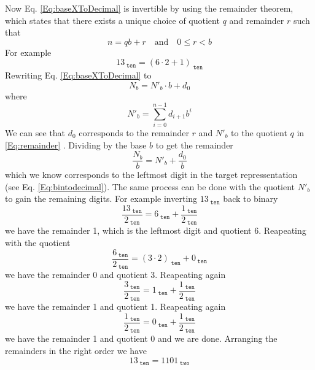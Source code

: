     Now Eq. \ref{Eq:baseXToDecimal} is invertible by using the remainder theorem, which states that there exists a unique choice of quotient $q$ and remainder $r$ such that 
    \begin{equation}\label{Eq:remainder}
        n = qb+r \quad \text{and} \quad 0 \leq r < b
    \end{equation}
    For example
    \begin{equation}
        13_{\;\texttt{ten}} = (6\cdot 2 + 1)_{\;\texttt{ten}}
    \end{equation}
    Rewriting Eq. \ref{Eq:baseXToDecimal} to
    \begin{equation}\label{Eq:baseXToDecimalRemainderForm}
        N_b = N'_b \cdot b+d_0
    \end{equation}
    where
    \begin{equation}
        N'_b = \sum_{i=0}^{n-1} d_{i+1} b^i
    \end{equation}
    We can see that $d_0$ corresponds to the remainder $r$ and $N'_b$ to the quotient $q$ in \ref{Eq:remainder} .
    Dividing by the base $b$ to get the remainder
    \begin{equation}
        \frac{N_b}{b} = N'_b +\frac{d_0}{b}
    \end{equation}
    which we know corresponds to the leftmost digit in the target repressentation (see Eq. \ref{Eq:bintodecimal}). The same process can be done with the quotient $N'_b$ to gain the remaining digits.
    For example inverting $13_{\;\texttt{ten}}$ back to binary
    \begin{equation}
        \frac{13_{\;\texttt{ten}}}{2_{\;\texttt{ten}}} = 6_{\;\texttt{ten}} + \frac{1_{\;\texttt{ten}} }{2_{\;\texttt{ten}} }
    \end{equation}
    we have the remainder 1, which is the leftmost digit and quotient 6. Reapeating with the quotient
    \begin{equation}
        \frac{6_{\;\texttt{ten}}}{2_{\;\texttt{ten}}} = (3\cdot 2)_{\;\texttt{ten}} + 0_{\;\texttt{ten}} 
    \end{equation}
    we have the remainder 0 and quotient 3. Reapeating again
    \begin{equation}
        \frac{3_{\;\texttt{ten}}}{2_{\;\texttt{ten}}} = 1_{\;\texttt{ten}} + \frac{1_{\;\texttt{ten}} }{2_{\;\texttt{ten}} }
    \end{equation}
    we have the remainder 1 and quotient 1. Reapeating again
    \begin{equation}
    \frac{1_{\;\texttt{ten}}}{2_{\;\texttt{ten}}} = 0_{\;\texttt{ten}} + \frac{1_{\;\texttt{ten}} }{2_{\;\texttt{ten}} }
    \end{equation}
    we have the remainder 1 and quotient 0 and we are done.
    Arranging the remainders in the right order we have
    \begin{equation}
    13_{\;\texttt{ten}} = 1101_{\;\texttt{two}} 
    \end{equation}
    
